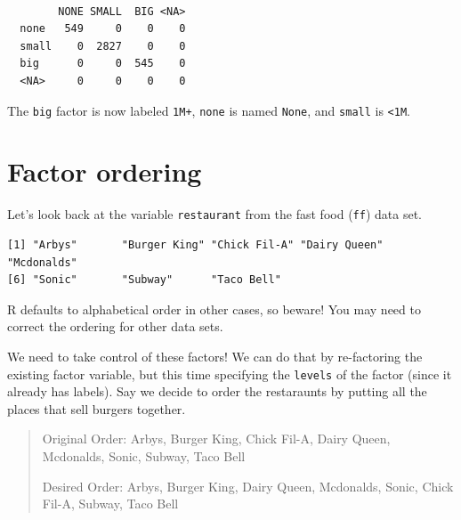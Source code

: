 \documentclass[
  letterpaper,
  DIV=11,
  numbers=noendperiod,
  oneside]{scrreprt}
\newenvironment{Shaded}{\begin{snugshade}}{\end{snugshade}}
\newcommand{\FunctionTok}[1]{\textcolor[rgb]{0.28,0.35,0.67}{#1}}
\newcommand{\NormalTok}[1]{\textcolor[rgb]{0.00,0.23,0.31}{#1}}
\newcommand{\SpecialCharTok}[1]{\textcolor[rgb]{0.37,0.37,0.37}{#1}}
\begin{document}
\begin{verbatim}
       
        NONE SMALL  BIG <NA>
  none   549     0    0    0
  small    0  2827    0    0
  big      0     0  545    0
  <NA>     0     0    0    0
\end{verbatim}

The \texttt{big} factor is now labeled \texttt{1M+}, \texttt{none} is
named \texttt{None}, and \texttt{small} is \texttt{\textless{}1M}.

\section{Factor ordering}\label{factor-ordering}

Let's look back at the variable \texttt{restaurant} from the fast food
(\texttt{ff}) data set.

\begin{Shaded}
\end{Shaded}

\begin{verbatim}
[1] "Arbys"       "Burger King" "Chick Fil-A" "Dairy Queen" "Mcdonalds"  
[6] "Sonic"       "Subway"      "Taco Bell"  
\end{verbatim}

R defaults to alphabetical order in other cases, so beware! You may need
to correct the ordering for other data sets.

We need to take control of these factors! We can do that by re-factoring
the existing factor variable, but this time specifying the
\texttt{levels} of the factor (since it already has labels). Say we
decide to order the restaraunts by putting all the places that sell
burgers together.

\begin{quote}
Original Order: Arbys, Burger King, Chick Fil-A, Dairy Queen, Mcdonalds,
Sonic, Subway, Taco Bell

Desired Order: Arbys, Burger King, Dairy Queen, Mcdonalds, Sonic, Chick
Fil-A, Subway, Taco Bell
\end{quote}

{}
\end{document}
